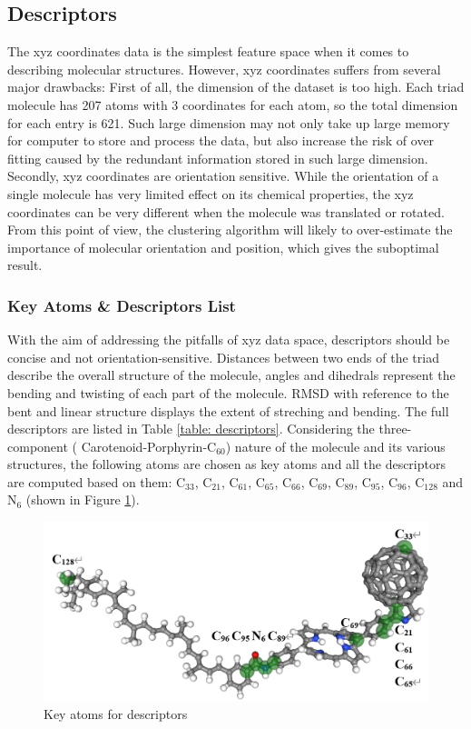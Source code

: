 \documentclass[a4paper]{article}
\begin{document}
\subsection{Descriptors}
The xyz coordinates data is the simplest feature space when it comes to describing molecular structures. However, xyz coordinates suffers from several major drawbacks: First of all, the dimension of the dataset is too high. Each triad molecule has 207 atoms with 3 coordinates for each atom, so the total dimension for each entry is 621. Such large dimension may not only take up large memory for computer to store and process the data, but also increase the risk of over fitting caused by the redundant information stored in such large dimension. Secondly, xyz coordinates are orientation sensitive. While the orientation of a single molecule has very limited effect on its chemical properties, the xyz coordinates can be very different when the molecule was translated or rotated. From this point of view, the clustering algorithm will likely to over-estimate the importance of molecular orientation and position, which gives the suboptimal result.

\subsubsection{Key Atoms \& Descriptors List}
With the aim of addressing the pitfalls of xyz data space, descriptors should be concise and not orientation-sensitive. Distances between two ends of the triad describe the overall structure of the molecule, angles and dihedrals represent the bending and twisting of each part of the molecule. RMSD with reference to the bent and linear structure displays the extent of streching and bending. The full descriptors are listed in Table \ref{table: descriptors}. Considering the three-component ( Carotenoid-Porphyrin-\(\text{C}_{60}\))  nature of the molecule and its various structures, the following atoms are chosen as key atoms and all the descriptors are computed based on them: \(\text{C}_{33}\), \(\text{C}_{21}\), \(\text{C}_{61}\), \(\text{C}_{65}\), \(\text{C}_{66}\), \(\text{C}_{69}\), \(\text{C}_{89}\), \(\text{C}_{95}\), \(\text{C}_{96}\), \(\text{C}_{128}\) and \(\text{N}_{6}\) (shown in Figure \ref{fig: key atoms}).

\begin{figure}[H]
    \centering
    \includegraphics[width=0.75\linewidth]{projects/Gustave_Li/Docs/pics/key_atoms.png}
    \caption{Key atoms for descriptors}
    \label{fig: key atoms}
\end{figure} 
\end{document}
